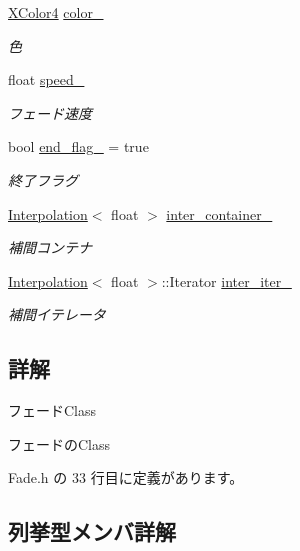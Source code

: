 \begin{DoxyCompactItemize}
\mbox{\hyperlink{_vector3_d_8h_a680c30c4a07d86fe763c7e01169cd6cc}{X\+Color4}} \mbox{\hyperlink{class_fade_af3b40978f7e38980379c9189aadcf310}{color\+\_\+}}
\begin{DoxyCompactList}\small\item\em 色 \end{DoxyCompactList}\item 
float \mbox{\hyperlink{class_fade_af46cade81dd992a5d8a0fe241aefd8b2}{speed\+\_\+}}
\begin{DoxyCompactList}\small\item\em フェード速度 \end{DoxyCompactList}\item 
bool \mbox{\hyperlink{class_fade_aeeddfe04f4dc156f2f4f0db903bb7fa1}{end\+\_\+flag\+\_\+}} = true
\begin{DoxyCompactList}\small\item\em 終了フラグ \end{DoxyCompactList}\item 
\mbox{\hyperlink{class_interpolation}{Interpolation}}$<$ float $>$ \mbox{\hyperlink{class_fade_a2e7ace29a63666158f1b3b12ddf10be5}{inter\+\_\+container\+\_\+}}
\begin{DoxyCompactList}\small\item\em 補間コンテナ \end{DoxyCompactList}\item 
\mbox{\hyperlink{class_interpolation}{Interpolation}}$<$ float $>$\+::Iterator \mbox{\hyperlink{class_fade_a60961f91ed0fc7aeae5fa957e90c7b0f}{inter\+\_\+iter\+\_\+}}
\begin{DoxyCompactList}\small\item\em 補間イテレータ \end{DoxyCompactList}\end{DoxyCompactItemize}


\subsection{詳解}
フェード\+Class 

フェードの\+Class 

 Fade.\+h の 33 行目に定義があります。



\subsection{列挙型メンバ詳解}
\mbox{\label{class_fade_ae77826bf3ff2ab95fb7b3b6f95cba80a}} 
